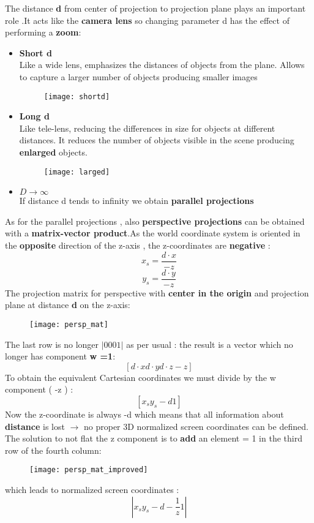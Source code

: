 The distance \textbf{d} from center of projection to projection plane plays an important role .It acts like the \textbf{camera lens}  so changing parameter d has the effect of performing a \textbf{zoom}:\\
\begin{itemize}
\item \textbf{Short d}\\
Like a wide lens, emphasizes the distances of objects from the plane.
Allows to capture a larger number of objects producing smaller images
\begin{figure}[H]
 \centering
  \texttt{[image: shortd]}
\end{figure}
\item \textbf{Long d}\\
Like tele-lens, reducing the differences in size for objects at different distances.
It reduces the number of objects visible in the scene producing \textbf{enlarged} objects.
\begin{figure}[H]
 \centering
  \texttt{[image: larged]}
\end{figure}
\item  $D \to \infty$\\
If distance d tends to infinity we obtain \textbf{parallel projections}
\end{itemize}

As for the parallel projections , also \textbf{perspective projections} can be obtained with a \textbf{matrix-vector product}.As the world coordinate system is oriented  in the \textbf{opposite} direction of the z-axis , the z-coordinates are \textbf{negative} :
\[
\boxed{x_s = \frac{d \cdot x}{-z}}
\]
\[
\boxed{y_s = \frac{d \cdot y}{-z}}
\]
The projection matrix for perspective with \textbf{center in the origin} and projection plane at distance \textbf{d} on the z-axis:
\begin{figure}[H]
 \centering
  \texttt{[image: persp\_mat]}
\end{figure}
The last row is no longer $|0 0 0 1|$ as per usual : the result is a vector which no longer has component \textbf{w =1}:
\[
\boxed{[d\cdot x d\cdot y d\cdot z -z]}
\]
To obtain the equivalent Cartesian coordinates we must divide by the w component ( -z ) : 
$$ [x_s  y_s -d 1] $$
Now the z-coordinate is always -d  which means that all information about \textbf{distance} is lost $\to$ no proper 3D normalized screen coordinates can be defined.\\
The solution to not flat the z component is to \textbf{add} an element = 1 in the third row of the fourth column:
\begin{figure}[H]
 \centering
  \texttt{[image: persp\_mat\_improved]}
\end{figure}
which leads to normalized screen coordinates :
$$ |x_s y_s -d-\frac{1}{z} 1|$$

